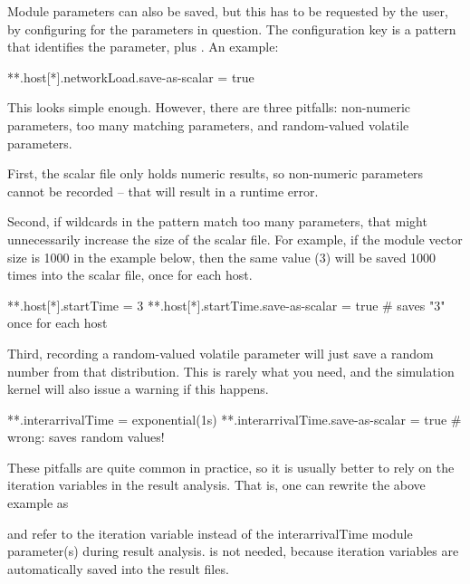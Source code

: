 Module parameters can also be saved, but this has to be
requested by the user, by configuring  for the
parameters in question. The configuration key is a pattern that
identifies the parameter, plus . An example:

\begin{inifile}
**.host[*].networkLoad.save-as-scalar = true
\end{inifile}

This looks simple enough. However, there are three pitfalls:
non-numeric parameters, too many matching parameters, and
random-valued volatile parameters.

First, the scalar file only holds numeric results, so non-numeric
parameters cannot be recorded -- that will result in a runtime
error.

Second, if wildcards in the pattern match too many parameters, that
might unnecessarily increase the size of the scalar file. For example,
if the  module vector size is 1000 in the example below, then the
same value (3) will be saved 1000 times into the scalar file, once for
each host.

\begin{inifile}
**.host[*].startTime = 3
**.host[*].startTime.save-as-scalar = true  # saves "3" once for each host
\end{inifile}

Third, recording a random-valued volatile parameter will just save a
random number from that distribution. This is rarely what you need, and
the simulation kernel will also issue a warning if this happens.

\begin{inifile}
**.interarrivalTime = exponential(1s)
**.interarrivalTime.save-as-scalar = true  # wrong: saves random values!
\end{inifile}

These pitfalls are quite common in practice, so it is usually better
to rely on the iteration variables in the result analysis.
That is, one can rewrite the above example as


and refer to the  iteration variable instead of the
interarrivalTime module parameter(s) during result analysis.
 is not needed, because iteration variables are
automatically saved into the result files.



